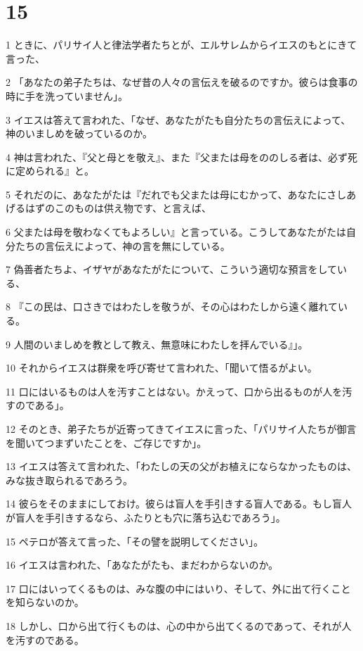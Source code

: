 \chapter{15}

\par 1 ときに、パリサイ人と律法学者たちとが、エルサレムからイエスのもとにきて言った、
\par 2 「あなたの弟子たちは、なぜ昔の人々の言伝えを破るのですか。彼らは食事の時に手を洗っていません」。
\par 3 イエスは答えて言われた、「なぜ、あなたがたも自分たちの言伝えによって、神のいましめを破っているのか。
\par 4 神は言われた、『父と母とを敬え』、また『父または母をののしる者は、必ず死に定められる』と。
\par 5 それだのに、あなたがたは『だれでも父または母にむかって、あなたにさしあげるはずのこのものは供え物です、と言えば、
\par 6 父または母を敬わなくてもよろしい』と言っている。こうしてあなたがたは自分たちの言伝えによって、神の言を無にしている。
\par 7 偽善者たちよ、イザヤがあなたがたについて、こういう適切な預言をしている、
\par 8 『この民は、口さきではわたしを敬うが、その心はわたしから遠く離れている。
\par 9 人間のいましめを教として教え、無意味にわたしを拝んでいる』」。
\par 10 それからイエスは群衆を呼び寄せて言われた、「聞いて悟るがよい。
\par 11 口にはいるものは人を汚すことはない。かえって、口から出るものが人を汚すのである」。
\par 12 そのとき、弟子たちが近寄ってきてイエスに言った、「パリサイ人たちが御言を聞いてつまずいたことを、ご存じですか」。
\par 13 イエスは答えて言われた、「わたしの天の父がお植えにならなかったものは、みな抜き取られるであろう。
\par 14 彼らをそのままにしておけ。彼らは盲人を手引きする盲人である。もし盲人が盲人を手引きするなら、ふたりとも穴に落ち込むであろう」。
\par 15 ペテロが答えて言った、「その譬を説明してください」。
\par 16 イエスは言われた、「あなたがたも、まだわからないのか。
\par 17 口にはいってくるものは、みな腹の中にはいり、そして、外に出て行くことを知らないのか。
\par 18 しかし、口から出て行くものは、心の中から出てくるのであって、それが人を汚すのである。
